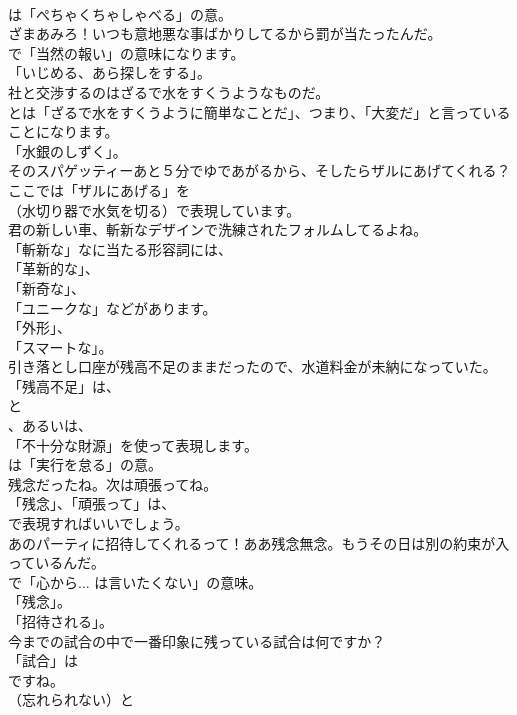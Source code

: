 \documentclass[8pt]{extreport}
\begin{document}
\begin{CJK}{UTF8}{min}
\\	は「ぺちゃくちゃしゃべる」の意。	
\\	ざまあみろ！いつも意地悪な事ばかりしてるから罰が当たったんだ。 
\\	で「当然の報い」の意味になります。
\\	「いじめる、あら探しをする」。	
\\	社と交渉するのはざるで水をすくうようなものだ。 
\\	とは「ざるで水をすくうように簡単なことだ」、つまり、「大変だ」と言っていることになります。
\\	「水銀のしずく」。	
\\	そのスパゲッティーあと５分でゆであがるから、そしたらザルにあげてくれる？ 
\\	ここでは「ザルにあげる」を 
\\	（水切り器で水気を切る）で表現しています。	
\\	君の新しい車、斬新なデザインで洗練されたフォルムしてるよね。 
\\	「斬新な」なに当たる形容詞には、
\\	「革新的な」、
\\	「新奇な」、
\\	「ユニークな」などがあります。
\\	「外形」、
\\	「スマートな」。	
\\	引き落とし口座が残高不足のままだったので、水道料金が未納になっていた。 
\\	「残高不足」は、
\\	と
\\	、あるいは、
\\	「不十分な財源」を使って表現します。
\\	は「実行を怠る」の意。	
\\	残念だったね。次は頑張ってね。 
\\	「残念」、「頑張って」は、
\\	で表現すればいいでしょう。	
\\	あのパーティに招待してくれるって！ああ残念無念。もうその日は別の約束が入っているんだ。 
\\	で「心から... は言いたくない」の意味。
\\	「残念」。
\\	「招待される」。	
\\	今までの試合の中で一番印象に残っている試合は何ですか？ 
\\	「試合」は 
\\	ですね。
\\	（忘れられない）と 

\end{CJK}
\end{document}
